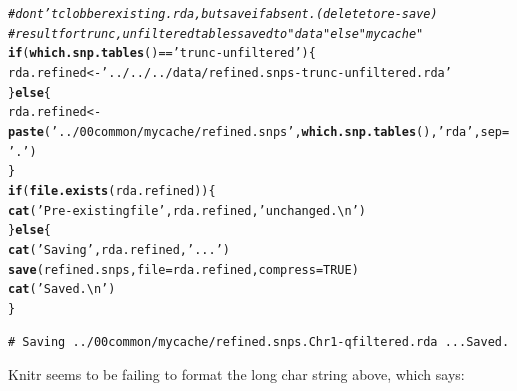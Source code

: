 \documentclass{article}\usepackage[]{graphicx}\usepackage[]{color}
\makeatletter
\newcommand{\hlnum}[1]{\textcolor[rgb]{0.686,0.059,0.569}{#1}}%
\newcommand{\hlstr}[1]{\textcolor[rgb]{0.192,0.494,0.8}{#1}}%
\newcommand{\hlcom}[1]{\textcolor[rgb]{0.678,0.584,0.686}{\textit{#1}}}%
\newcommand{\hlopt}[1]{\textcolor[rgb]{0,0,0}{#1}}%
\newcommand{\hlstd}[1]{\textcolor[rgb]{0.345,0.345,0.345}{#1}}%
\newcommand{\hlkwa}[1]{\textcolor[rgb]{0.161,0.373,0.58}{\textbf{#1}}}%
\newcommand{\hlkwb}[1]{\textcolor[rgb]{0.69,0.353,0.396}{#1}}%
\newcommand{\hlkwc}[1]{\textcolor[rgb]{0.333,0.667,0.333}{#1}}%
\newcommand{\hlkwd}[1]{\textcolor[rgb]{0.737,0.353,0.396}{\textbf{#1}}}%
\newenvironment{kframe}{%
 \def\at@end@of@kframe{}%
 \ifinner\ifhmode%
  \def\at@end@of@kframe{\end{minipage}}%
  \begin{minipage}{\columnwidth}%
 \fi\fi%
 \def\FrameCommand##1{\hskip\@totalleftmargin \hskip-\fboxsep
 \colorbox{shadecolor}{##1}\hskip-\fboxsep
     \hskip-\linewidth \hskip-\@totalleftmargin \hskip\columnwidth}%
 \MakeFramed {\advance\hsize-\width
   \@totalleftmargin\z@ \linewidth\hsize
   \@setminipage}}%
 {\par\unskip\endMakeFramed%
 \at@end@of@kframe}
\newenvironment{knitrout}{}{} %
\makeatother
\begin{document}
\begin{knitrout}
\begin{kframe}
\begin{alltt}
\hlcom{# dont't clobber existing .rda, but save if absent.  (delete to re-save)}
\hlcom{# result for trunc, unfiltered tables saved to "data" else "mycache"}
\hlkwa{if}\hlstd{(}\hlkwd{which.snp.tables}\hlstd{()} \hlopt{==} \hlstr{'trunc-unfiltered'}\hlstd{)\{}
  \hlstd{rda.refined} \hlkwb{<-} \hlstr{'../../../data/refined.snps-trunc-unfiltered.rda'}
\hlstd{\}} \hlkwa{else} \hlstd{\{}
  \hlstd{rda.refined} \hlkwb{<-} \hlkwd{paste}\hlstd{(}\hlstr{'../00common/mycache/refined.snps'}\hlstd{,} \hlkwd{which.snp.tables}\hlstd{(),} \hlstr{'rda'}\hlstd{,} \hlkwc{sep}\hlstd{=}\hlstr{'.'}\hlstd{)}
\hlstd{\}}
\hlkwa{if}\hlstd{(}\hlkwd{file.exists}\hlstd{(rda.refined))\{}
  \hlkwd{cat}\hlstd{(}\hlstr{'Pre-existing file'}\hlstd{, rda.refined,} \hlstr{'unchanged.\textbackslash{}n'}\hlstd{)}
\hlstd{\}} \hlkwa{else} \hlstd{\{}
  \hlkwd{cat}\hlstd{(}\hlstr{'Saving'}\hlstd{, rda.refined,} \hlstr{'...'}\hlstd{)}
  \hlkwd{save}\hlstd{(refined.snps,} \hlkwc{file}\hlstd{=rda.refined,} \hlkwc{compress}\hlstd{=}\hlnum{TRUE}\hlstd{)}
  \hlkwd{cat}\hlstd{(}\hlstr{'Saved.\textbackslash{}n'}\hlstd{)}
\hlstd{\}}
\end{alltt}
\begin{verbatim}
# Saving ../00common/mycache/refined.snps.Chr1-qfiltered.rda ...Saved.
\end{verbatim}
\end{kframe}
\end{knitrout}

Knitr seems to be failing to format the long char string above, which says:
\end{document}
